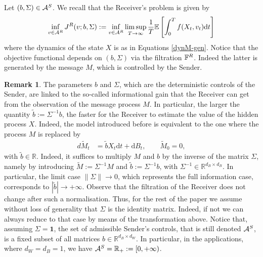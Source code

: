 \documentclass[a4paper,10pt]{article}
\newcommand{\EE}{\mathbb{E}}
\newcommand{\RR}{\mathbb{R}}
\newcommand{\D}{\mathrm{d}}
\theoremstyle{definition}
\newtheorem{remark}[theorem]{Remark}
\theoremstyle{plain}
\numberwithin{equation}{section}
\begin{document}
Let $(b,\Sigma) \in \mathcal A^{\rm S}$. We recall that the Receiver's problem is given by
\begin{align*}
    \inf_{v \in \mathcal A^{\rm R}}  J^{\rm R}(v;b,\Sigma) := \inf_{v \in \mathcal A^{\rm R}} \limsup_{T \to \infty}\frac{1}{T}\EE \left[ \int_0^T f(X_t,v_t) \D t \right]
\end{align*}
where the dynamics of the state $X$ is as in Equations \eqref{dynM-gen}. Notice that the objective functional depends on $(b,\Sigma)$ via the filtration $\mathbb F^{\rm R}$. Indeed the latter is generated by the message $M$, which is controlled by the Sender. 


\begin{remark}\label{rem:sigma}
    The parameters $b$ and $\Sigma$, which are the deterministic controls of the Sender, are linked to the so-called informational gain that the Receiver can get from the observation of the message process $M$. In particular, the larger the quantity $\widetilde{b}:= \Sigma^{-1}b$, the faster for the Receiver to estimate the value of the hidden process $X$. 
    Indeed, the model introduced before is equivalent to the one where the process $M$ is replaced by
    	\begin{align}\label{eq:dyn-tildeM}
    		d\widetilde{M}_t &= \widetilde{b} X_t \D t +   \D B_t, \qquad \widetilde{M}_0=0,
    	\end{align}
    with $\widetilde{b} \in \mathbb{R}$.
    Indeed, it suffices to multiply $M$ and $b$ by the inverse of the matrix $\Sigma$, namely by introducing 
    $\widetilde{M}:=\Sigma^{-1} M$ and  
    $\widetilde{b}:=\Sigma^{-1} b$, with $\Sigma^{-1} \in \RR^{d_B \times d_B}$.
    In particular, the limit case $\| \Sigma \| \to 0$, which represents the full information case, corresponds to $|\widetilde b | \to +\infty$. Observe that the filtration of the Receiver does not change after such a normalisation. Thus, for the rest of the paper we assume without loss of generality that $\Sigma$ is the identity matrix. Indeed, if not we can always reduce to that case by means of the transformation above. Notice that, assuming $\Sigma = \mathbf 1$, the set of admissible Sender's controls, that is still denoted $\mathcal A^{\rm S}$, is a fixed subset of all matrices $b \in \RR^{d_B \times d_W}$. In particular, in the applications, where $d_W = d_B =1$, we have $\mathcal A^{\rm S} = \RR_+ := [0,+\infty)$. 
\end{remark}
\end{document}
